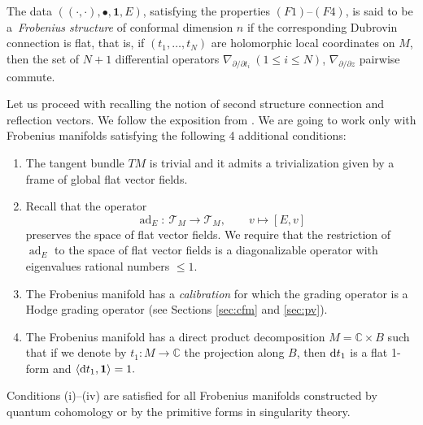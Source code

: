 \documentclass[pdftex]{sigma}
\numberwithin{equation}{section}
\newcommand{\CC}{\mathbb{C}}
\newcommand{\one}{\mathbf{1}}
\newcommand{\T}{\mathcal{T}}
\begin{document}
\begin{Definition}\label{def:frob-manifold}
 The data $((\cdot,\cdot), \bullet, \one, E)$, satisfying the properties
 $(F1)$--$(F4)$, is said to be a~{\em Frobenius structure} of conformal
 dimension $n$ if the corresponding Dubrovin connection is flat, that
 is, if $(t_1,\dots,t_N)$ are holomorphic local coordinates on $M$,
 then the set of $N+1$ differential operators
$
\nabla_{\partial/\partial t_i} \ (1\leq i\leq N)$,
$
\nabla_{\partial/\partial z}
$
pairwise commute.

\end{Definition}

Let us proceed with recalling the notion of second structure connection
and reflection vectors. We follow the exposition from \cite{Milanov:p2}.
We are going to work only with Frobenius manifolds satisfying the
following 4 additional conditions:
\begin{enumerate}\itemsep=0pt
\item[(i)] The tangent bundle $TM$ is trivial and it admits a
 trivialization given by a frame of global flat vector fields.
\item[(ii)]
Recall that the operator
\[
\operatorname{ad}_E\colon\ \T_M\to \T_M,\qquad v\mapsto [E,v]
\]
preserves the space of flat vector fields. We require that the
restriction of $\operatorname{ad}_E$ to the space of flat vector
fields is a diagonalizable operator with eigenvalues rational numbers
$\leq 1$.
\item[(iii)]
 The Frobenius manifold has a {\em calibration} for which the grading
 operator is a Hodge grading operator (see Sections
 \ref{sec:cfm} and \ref{sec:pv}).
\item[(iv)]
 The Frobenius manifold has a direct product decomposition
 $M=\CC\times B$ such that if we denote by $t_1\colon M\to
 \CC$ the projection along $B$, then ${\rm d}t_1$ is a flat 1-form and
 $\langle {\rm d}t_1,\mathbf{1}\rangle=1.$
\end{enumerate}
Conditions (i)--(iv) are satisfied for all Frobenius manifolds
constructed by quantum cohomology or by the primitive forms in
singularity theory.
\end{document}
